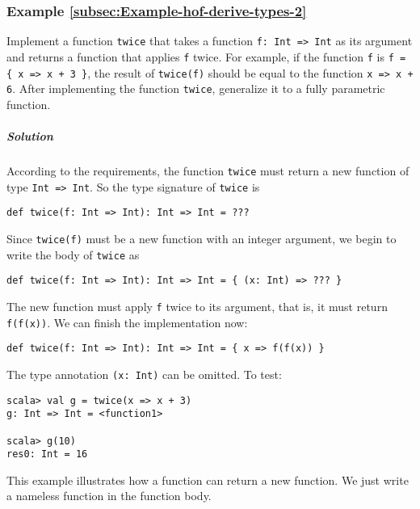 \subsubsection{Example \label{subsec:Example-hof-derive-types-2}\ref{subsec:Example-hof-derive-types-2}}

Implement a function \lstinline!twice!
that takes a function \lstinline!f: Int => Int!
as its argument and returns a function that applies \lstinline!f!
twice. For example, if the function \lstinline!f!
is \lstinline!f = { x => x + 3 }!,
the result of \lstinline!twice(f)!
should be equal to the function \lstinline!x => x + 6!.
After implementing the function \lstinline!twice!,
generalize it to a fully parametric function.

\subparagraph{Solution}

According to the requirements, the function \lstinline!twice!
must return a new function of type \lstinline!Int => Int!.
So the type signature of \lstinline!twice!
is
\begin{lstlisting}
def twice(f: Int => Int): Int => Int = ???
\end{lstlisting}
Since \lstinline!twice(f)!
must be a new function with an integer argument, we begin to write
the body of \lstinline!twice!
as
\begin{lstlisting}
def twice(f: Int => Int): Int => Int = { (x: Int) => ??? }
\end{lstlisting}
The new function must apply \lstinline!f!
twice to its argument, that is, it must return \lstinline!f(f(x))!.
We can finish the implementation now:
\begin{lstlisting}
def twice(f: Int => Int): Int => Int = { x => f(f(x)) }
\end{lstlisting}
The type annotation \lstinline!(x: Int)!
can be omitted. To test:
\begin{lstlisting}
scala> val g = twice(x => x + 3)
g: Int => Int = <function1>

scala> g(10)
res0: Int = 16
\end{lstlisting}
This example illustrates how a function can return a new function.
We just write a nameless function in the function body.

